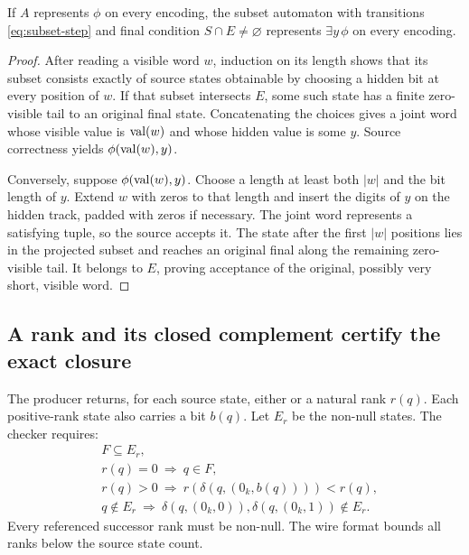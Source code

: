 \begin{theorem}\label{thm:exists}
If \(A\) represents \(\phi\) on every encoding, the subset automaton with transitions \eqref{eq:subset-step} and final condition \(S\cap E\ne\varnothing\) represents \(\exists y\,\phi\) on every encoding.
\end{theorem}
\begin{proof}
After reading a visible word \(w\), induction on its length shows that its subset consists exactly of source states obtainable by choosing a hidden bit at every position of \(w\). If that subset intersects \(E\), some such state has a finite zero-visible tail to an original final state. Concatenating the choices gives a joint word whose visible value is \(\operatorname{val}(w)\) and whose hidden value is some \(y\). Source correctness yields \(\phi(\operatorname{val}(w),y)\).

Conversely, suppose \(\phi(\operatorname{val}(w),y)\). Choose a length at least both \(|w|\) and the bit length of \(y\). Extend \(w\) with zeros to that length and insert the digits of \(y\) on the hidden track, padded with zeros if necessary. The joint word represents a satisfying tuple, so the source accepts it. The state after the first \(|w|\) positions lies in the projected subset and reaches an original final along the remaining zero-visible tail. It belongs to \(E\), proving acceptance of the original, possibly very short, visible word.
\end{proof}

\subsection{A rank and its closed complement certify the exact closure}
The producer returns, for each source state, either  or a natural rank \(r(q)\). Each positive-rank state also carries a bit \(b(q)\). Let \(E_r\) be the non-null states. The checker requires:
\begin{align}
 &F\subseteq E_r,\label{eq:tail-base}\\
 &r(q)=0\ \Longrightarrow\ q\in F,\label{eq:tail-zero}\\
 &r(q)>0\ \Longrightarrow\ r(\delta(q,(0_k,b(q))))<r(q),\label{eq:tail-descent}\\
 &q\notin E_r\ \Longrightarrow\
   \delta(q,(0_k,0)),\delta(q,(0_k,1))\notin E_r.\label{eq:tail-exclusion}
\end{align}
Every referenced successor rank must be non-null. The wire format bounds all ranks below the source state count.

